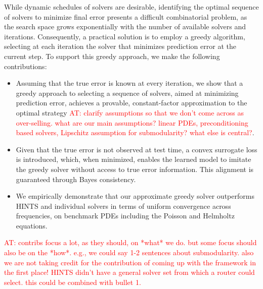 \documentclass{article} %
\newcommand\ambuj[1]{\textcolor{red}{AT: #1}}
\begin{document}

While dynamic schedules of solvers are desirable, identifying the optimal sequence of solvers to minimize final error presents a difficult combinatorial problem, as the search space grows exponentially with the number of available solvers and iterations. Consequently, a practical solution is to employ a greedy algorithm, selecting at each iteration the solver that minimizes prediction error at the current step. To support this greedy approach, we make the following contributions:
\begin{itemize}
    \item Assuming that the true error is known at every iteration, we show that a greedy approach to selecting a sequence of solvers, aimed at minimizing prediction error, achieves a provable, constant-factor approximation to the optimal strategy \ambuj{clarify assumptions so that we don't come across as over-selling. what are our main assumptions? linear PDEs, preconditioning based solvers, Lipschitz assumption for submodularity? what else is central?}.
    \item  Given that the true error is not observed at test time, a convex surrogate loss is introduced,
    which, when minimized, enables the learned model to imitate the greedy solver without access to true error information. This alignment is guaranteed through Bayes consistency.
    \item We empirically demonstrate that our approximate greedy solver outperforms HINTS and individual solvers in terms of uniform convergence across frequencies, on benchmark PDEs including the Poisson and Helmholtz equations.
\end{itemize}

\ambuj{contribs focus a lot, as they should, on *what* we do. but some focus should also be on the *how*. e.g., we could say 1-2 sentences about submodularity. also we are not taking credit for the contribution of coming up with the framework in the first place! HINTS didn't have a general solver set from which a router could select. this could be combined with bullet 1.}
\end{document}
